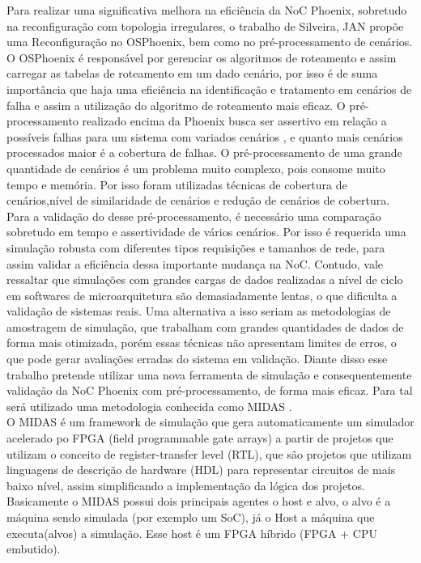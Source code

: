 \documentclass[conference]{IEEEtran}
\begin{document}
	Para realizar uma significativa melhora na eficiência da NoC Phoenix, sobretudo na reconfiguração com topologia irregulares, o trabalho de Silveira, JAN \cite{b5} propõe uma Reconfiguração no OSPhoenix, bem como no pré-processamento de cenários. O OSPhoenix é responsável por gerenciar os algoritmos de roteamento e assim carregar as tabelas de roteamento em um dado cenário, por isso é de suma importância que haja uma eficiência na identificação e tratamento em cenários de
	falha e assim a utilização do algoritmo de roteamento mais eficaz.
	O pré-processamento realizado encima da Phoenix busca ser assertivo em relação a possíveis falhas para um sistema com variados cenários , e quanto mais cenários processados maior é a cobertura de falhas. O pré-processamento de uma grande quantidade de cenários é um problema muito complexo, pois consome muito tempo e memória. Por isso foram utilizadas técnicas de cobertura de cenários,nível de similaridade de cenários e redução de cenários de cobertura. \\
	Para a validação do desse pré-processamento, é necessário uma comparação sobretudo em tempo e assertividade de vários cenários. Por isso é requerida uma simulação robusta com diferentes tipos requisições
	e tamanhos de rede, para assim validar a eficiência dessa importante mudança na NoC. Contudo, vale ressaltar que simulações com grandes cargas de dados realizadas a nível de ciclo em softwares de microarquitetura são demasiadamente lentas, o que dificulta a validação de sistemas reais. Uma alternativa a isso seriam as metodologias de amostragem de simulação, que trabalham com grandes quantidades de dados de forma mais otimizada, porém essas técnicas não apresentam limites de erros, o que pode gerar avaliações erradas do sistema em validação\cite{b9}. Diante disso esse trabalho pretende utilizar uma nova ferramenta de simulação e consequentemente validação da NoC Phoenix com pré-processamento, de forma mais eficaz. Para tal será utilizado uma metodologia conhecida como MIDAS \cite{b8}.\\
	O MIDAS é um framework de simulação que gera automaticamente um simulador acelerado po FPGA (field programmable gate arrays) a partir de projetos que utilizam o conceito de register-transfer level (RTL), que são projetos que utilizam linguagens de descrição de hardware (HDL) para representar circuitos de mais baixo nível, assim simplificando a implementação da lógica dos projetos. Basicamente o MIDAS possui dois principais agentes o host e alvo, o alvo é a máquina sendo simulada (por exemplo um SoC), já o Host a máquina que executa(alvos) a simulação. Esse host é um FPGA híbrido (FPGA + CPU embutido).\\
\end{document}
